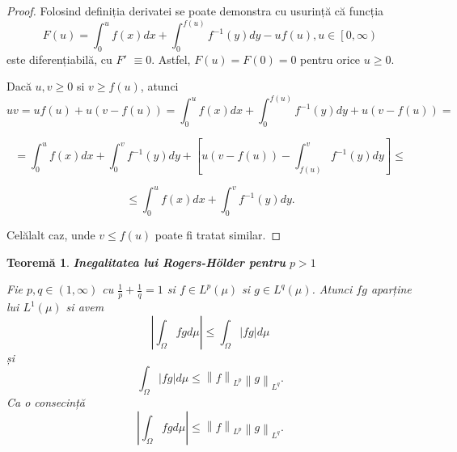 \documentclass[a4paper,12pt,oneside]{report}
\newtheorem{theorem}{Teorem\u a}
\begin{document}
\begin{proof}
Folosind definiția derivatei se poate demonstra cu usurință că funcția
\begin{displaymath}
  F\left ( u \right )= \int_{0}^{u}f\left ( x \right )dx + \int_{0}^{f\left ( u \right )}f^{-1}\left ( y \right )dy -uf\left ( u \right ), u \in \left [ 0,\infty  \right )
\end{displaymath}
este diferențiabilă, cu \({F}'\) $\equiv 0.$ Astfel, \(F\left ( u \right )= F\left ( 0 \right )= 0\) pentru orice \(u\geq 0\).
	
Dacă \(u, v \geq 0\)  si \(v\geq f\left ( u \right )\), atunci
\begin{displaymath}
  uv = uf\left ( u \right )+ u\left ( v- f\left ( u \right ) \right )=  \int_{0}^{u}f\left ( x \right )dx + \int_{0}^{f\left ( u \right )}f^{-1}\left ( y \right )dy + u\left ( v - f\left ( u \right ) \right ) =
\end{displaymath}

\begin{displaymath}
  = \int_{0}^{u}f\left ( x \right )dx + \int_{0}^{v}f^{-1}\left ( y \right )dy + \left [ u\left ( v-f\left ( u \right )  \right ) - \int_{f\left ( u \right )}^{v}f^{-1}\left ( y \right )dy\right ]\leq
\end{displaymath}

\begin{displaymath}
  \leq \int_{0}^{u}f\left ( x \right )dx + \int_{0}^{v}f^{-1}\left ( y \right )dy.
\end{displaymath}



	Celălalt caz, unde \(v\leq f\left ( u \right )\) poate fi tratat similar.
\end{proof}

\begin{theorem}

\textbf{Inegalitatea lui Rogers-Hölder pentru} \(p > 1\)

Fie \(p,q \in \left ( 1, \infty  \right )\) cu \(\frac{1}{p} + \frac{1}{q} = 1\) si  \(f\in L^{p}\left ( \mu  \right )\) si \(g\in L^{q}\left ( \mu  \right )\). Atunci \(fg\) aparține lui \(L^{1}\left ( \mu  \right )\) si avem
\begin{displaymath}
  \left | \int_{\Omega}^{} fg  d\mu \right |\leq \int_{\Omega}^{}\left | fg \right |d\mu \label{eq:1.6} \tag{1.6}
\end{displaymath}
și
\begin{displaymath}
  \int_{\Omega}^{}\left | fg \right |d\mu \leq \left \| f \right \|_{L^{p}}\left \| g \right \|_{{L}^{q}}. \label{eq:1.7} \tag{1.7}
\end{displaymath}
Ca o consecință
\begin{displaymath}
  \left | \int_{\Omega}^{} fg  d\mu \right |\leq \left \| f \right \|_{L^{p}}\left \| g \right \|_{{L}^{q}}. \label{eq:1.8} \tag{1.8}
\end{displaymath}
\end{theorem}
\end{document}
